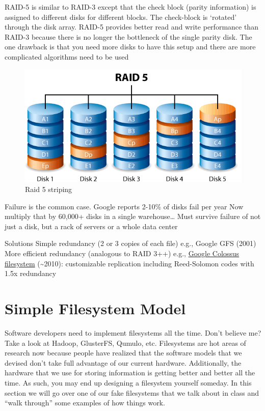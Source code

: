 RAID-5 is similar to RAID-3 except that the check block (parity information) is assigned to different disks for different blocks. The check-block is `rotated' through the disk array. RAID-5 provides better read and write performance than RAID-3 because there is no longer the bottleneck of the single parity disk. The one drawback is that you need more disks to have this setup and there are more complicated algorithms need to be used

\begin{figure}[htbp]
\centering
\includegraphics[width=.8\textwidth]{filesystems/images/raid_5.png}
\caption{Raid 5 striping}
\end{figure}

Failure is the common case. Google reports 2-10\% of disks fail per year Now multiply that by 60,000+ disks in a single warehouse\ldots{} Must survive failure of not just a disk, but a rack of servers or a whole data center

Solutions Simple redundancy (2 or 3 copies of each file) e.g., Google GFS (2001) More efficient redundancy (analogous to RAID 3++) e.g., \href{http://goo.gl/LwFIy}{Google Colossus filesystem} (\textasciitilde{}2010): customizable replication including Reed-Solomon codes with 1.5x redundancy

\section{Simple Filesystem Model}

Software developers need to implement filesystems all the time. Don't believe me? Take a look at Hadoop, GlusterFS,
Qumulo, etc. Filesystems are hot areas of research now because people have realized that the software models that we
devised don't take full advantage of our current hardware. Additionally, the hardware that we use for storing information
is getting better and better all the time. As such, you may end up designing a filesystem yourself someday. In this
section we will go over one of our fake filesystems that we talk about in class and ``walk through'' some examples of
how things work.

